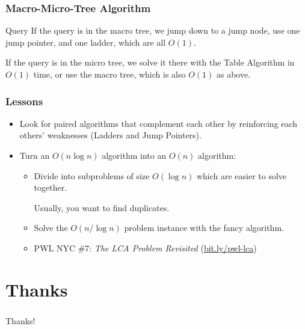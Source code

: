 \documentclass[aspectratio=169]{beamer}
\begin{document}
\begin{frame}
\frametitle{Macro-Micro-Tree Algorithm }

\begin{block}{Query}
  If the query is in the macro tree, we jump down to a jump node, use one
  jump pointer, and one ladder, which are all $O(1)$.

  \pause\vspace{1em} If the query is in the micro tree, we solve it there
  with the Table Algorithm in $O(1)$ time, or use the macro tree, which is
  also $O(1)$ as above.
\end{block}

\end{frame}

\begin{frame}
\frametitle{Lessons}

\begin{itemize}
\item<2-> Look for paired algorithms that complement each other by reinforcing
  each others' weaknesses (Ladders and Jump Pointers).
\item<3-> Turn an $O(n\log n)$ algorithm into an $O(n)$ algorithm:
  \begin{itemize}
  \item<4-> Divide into subproblems of size $O(\log n)$ which are easier
    to solve together.

    Usually, you want to find duplicates.
  \item<5-> Solve the $O(n/\log n)$ problem instance with the fancy
    algorithm.
  \item<6-> PWL NYC \#7: {\em The LCA Problem Revisited}
    (\href{https://bit.ly/pwl-lca}{bit.ly/pwl-lca})
  \end{itemize}
\end{itemize}

\end{frame}

\section{Thanks}

\begin{frame}
\frametitle{}

\centering
\Large
Thanks!

\end{frame}
\end{document}
